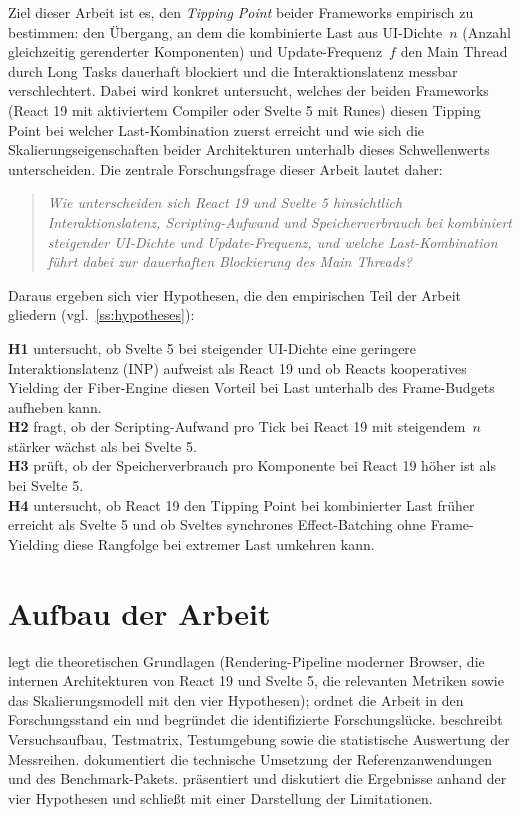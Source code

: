 Ziel dieser Arbeit ist es, den \textit{Tipping Point} beider Frameworks empirisch zu bestimmen: den Übergang, an dem die kombinierte Last aus UI-Dichte~$n$ (Anzahl gleichzeitig gerenderter Komponenten) und Update-Frequenz~$f$ den Main Thread durch Long Tasks \cite{w3c_longtasks_2026} dauerhaft blockiert und die Interaktionslatenz messbar verschlechtert. Dabei wird konkret untersucht, welches der beiden Frameworks (React 19 mit aktiviertem Compiler oder Svelte 5 mit Runes) diesen Tipping Point bei welcher Last-Kombination zuerst erreicht und wie sich die Skalierungseigenschaften beider Architekturen unterhalb dieses Schwellenwerts unterscheiden. Die zentrale Forschungsfrage dieser Arbeit lautet daher: 
\begin{quote}
\textit{Wie unterscheiden sich React 19 und Svelte 5 hinsichtlich Interaktionslatenz, Scripting-Aufwand und Speicherverbrauch bei kombiniert steigender UI-Dichte und Update-Frequenz, und welche Last-Kombination führt dabei zur dauerhaften Blockierung des Main Threads?}
\end{quote}
Daraus ergeben sich vier Hypothesen, die den empirischen Teil der Arbeit gliedern (vgl.\ \cref{ss:hypotheses}):

\noindent\textbf{H1} untersucht, ob Svelte 5 bei steigender UI-Dichte eine geringere Interaktionslatenz (INP) aufweist als React 19 und ob Reacts kooperatives Yielding der Fiber-Engine diesen Vorteil bei Last unterhalb des Frame-Budgets aufheben kann.\\
\noindent\textbf{H2} fragt, ob der Scripting-Aufwand pro Tick bei React 19 mit steigendem~$n$ stärker wächst als bei Svelte 5.\\
\noindent\textbf{H3} prüft, ob der Speicherverbrauch pro Komponente bei React 19 höher ist als bei Svelte 5.\\
\noindent\textbf{H4} untersucht, ob React 19 den Tipping Point bei kombinierter Last früher erreicht als Svelte 5 und ob Sveltes synchrones Effect-Batching ohne Frame-Yielding diese Rangfolge bei extremer Last umkehren kann.

\section{Aufbau der Arbeit}
\label{s:aufbau}

 legt die theoretischen Grundlagen (Rendering-Pipeline moderner Browser, die internen Architekturen von React 19 und Svelte 5, die relevanten Metriken sowie das Skalierungsmodell mit den vier Hypothesen);  ordnet die Arbeit in den Forschungsstand ein und begründet die identifizierte Forschungslücke.  beschreibt Versuchsaufbau, Testmatrix, Testumgebung sowie die statistische Auswertung der Messreihen.  dokumentiert die technische Umsetzung der Referenzanwendungen und des Benchmark-Pakets.  präsentiert und diskutiert die Ergebnisse anhand der vier Hypothesen und schließt mit einer Darstellung der Limitationen.
